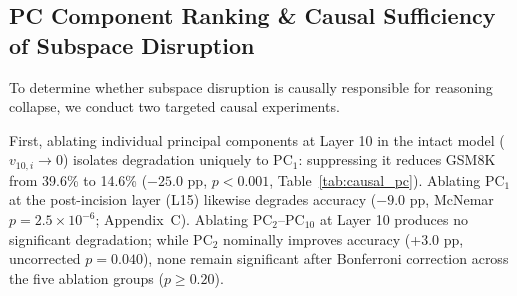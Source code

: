 \documentclass[pmlr,onecolumn]{jmlr}
\begin{document}
\subsection{PC Component Ranking \& Causal Sufficiency of Subspace Disruption}

To determine whether subspace disruption is causally responsible for reasoning collapse, we conduct two targeted causal experiments.

First, ablating individual principal components at Layer 10 in the intact model ($v_{10,i} \to 0$) isolates degradation uniquely to $\mathrm{PC}_1$: suppressing it reduces GSM8K from 39.6\% to 14.6\% ($-25.0$ pp, $p < 0.001$, Table~\ref{tab:causal_pc}). Ablating $\mathrm{PC}_1$ at the post-incision layer (L15) likewise degrades accuracy ($-9.0$ pp, McNemar $p = 2.5\times10^{-6}$; Appendix~C). Ablating $\mathrm{PC}_2$--$\mathrm{PC}_{10}$ at Layer 10 produces no significant degradation; while $\mathrm{PC}_2$ nominally improves accuracy (+3.0 pp, uncorrected $p = 0.040$), none remain significant after Bonferroni correction across the five ablation groups ($p \ge 0.20$).
\end{document}
